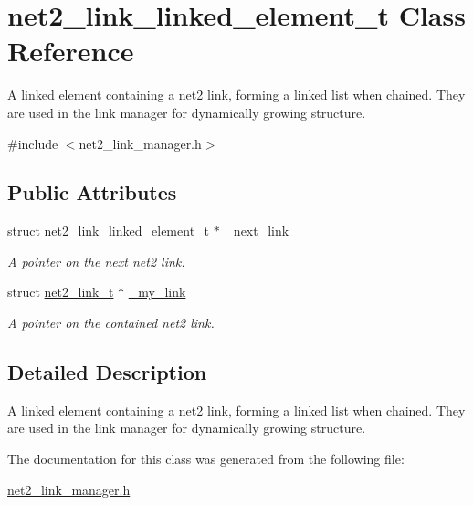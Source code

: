 \hypertarget{structnet2__link__linked__element__t}{\section{net2\-\_\-link\-\_\-linked\-\_\-element\-\_\-t Class Reference}
\label{structnet2__link__linked__element__t}
}


A linked element containing a net2 link, forming a linked list when chained. They are used in the link manager for dynamically growing structure.  




{\ttfamily \#include $<$net2\-\_\-link\-\_\-manager.\-h$>$}

\subsection*{Public Attributes}
\begin{DoxyCompactItemize}
\item 
\hypertarget{structnet2__link__linked__element__t_a167564acaf196fac9ae24b3192367b33}{struct \hyperlink{structnet2__link__linked__element__t}{net2\-\_\-link\-\_\-linked\-\_\-element\-\_\-t} $\ast$ \hyperlink{structnet2__link__linked__element__t_a167564acaf196fac9ae24b3192367b33}{\-\_\-next\-\_\-link}}\label{structnet2__link__linked__element__t_a167564acaf196fac9ae24b3192367b33}

\begin{DoxyCompactList}\small\item\em A pointer on the next net2 link. \end{DoxyCompactList}\item 
\hypertarget{structnet2__link__linked__element__t_a9259dac034e68a1681460c73581072b7}{struct \hyperlink{structnet2__link__t}{net2\-\_\-link\-\_\-t} $\ast$ \hyperlink{structnet2__link__linked__element__t_a9259dac034e68a1681460c73581072b7}{\-\_\-my\-\_\-link}}\label{structnet2__link__linked__element__t_a9259dac034e68a1681460c73581072b7}

\begin{DoxyCompactList}\small\item\em A pointer on the contained net2 link. \end{DoxyCompactList}\end{DoxyCompactItemize}


\subsection{Detailed Description}
A linked element containing a net2 link, forming a linked list when chained. They are used in the link manager for dynamically growing structure. 

The documentation for this class was generated from the following file\-:\begin{DoxyCompactItemize}
\item 
\hyperlink{net2__link__manager_8h}{net2\-\_\-link\-\_\-manager.\-h}\end{DoxyCompactItemize}
